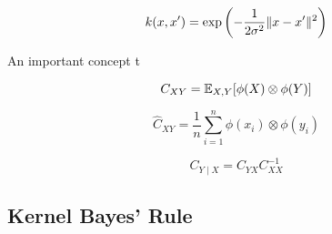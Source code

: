 \begin{equation}
  k(x,x') = \exp\left(-\frac{1}{2\sigma^2} \lVert x-x'\rVert^2 \right)
\end{equation}

An important concept t

\begin{equation}
  C_{XY} = \mathbb{E}_{X, Y}[\phi(X) \otimes \phi(Y)]
\end{equation}

\begin{equation}
  \widehat{C}_{XY} = \frac{1}{n} \sum_{i=1}^n \phi(x_i) \otimes \phi(y_i)
\end{equation}

\begin{equation}
  C_{Y \mid X} = C_{YX} C_{XX}^{-1}
\end{equation}

\subsection{Kernel Bayes' Rule}